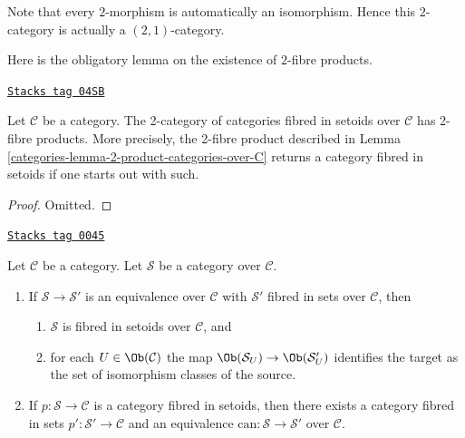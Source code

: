 Note that every $2$-morphism is automatically an isomorphism.
Hence this $2$-category is actually a $(2, 1)$-category.

Here is the obligatory lemma on the existence of $2$-fibre products.

\begin{lemma}
\label{categories-lemma-2-product-categories-fibred-setoids}
\href{https://stacks.math.columbia.edu/tag/04SB}{\texttt{Stacks tag 04SB}}

Let $\mathcal{C}$ be a category.
The 2-category of categories fibred in setoids over $\mathcal{C}$
has 2-fibre products. More precisely, the 2-fibre product described in
Lemma \ref{categories-lemma-2-product-categories-over-C} returns a category fibred in
setoids if one starts out with such.
\end{lemma}

\begin{proof}
Omitted.
\end{proof}

\begin{lemma}
\label{categories-lemma-setoid-fibres}
\href{https://stacks.math.columbia.edu/tag/0045}{\texttt{Stacks tag 0045}}

Let $\mathcal{C}$ be a category. Let $\mathcal{S}$ be a category
over $\mathcal{C}$.
\begin{enumerate}
\item If $\mathcal{S} \to \mathcal{S}'$ is an equivalence
over $\mathcal{C}$ with $\mathcal{S}'$ fibred in sets over $\mathcal{C}$,
then
\begin{enumerate}
\item $\mathcal{S}$ is fibred in setoids over $\mathcal{C}$, and
\item for each $U \in \Ob(\mathcal{C})$ the map
$\Ob(\mathcal{S}_U) \to \Ob(\mathcal{S}'_U)$
identifies the target as the set of isomorphism classes of the source.
\end{enumerate}
\item If $p : \mathcal{S} \to \mathcal{C}$ is a category fibred in setoids,
then there exists a category fibred in sets
$p' : \mathcal{S}' \to \mathcal{C}$ and an equivalence
$\text{can} : \mathcal{S} \to \mathcal{S}'$ over $\mathcal{C}$.
\end{enumerate}
\end{lemma}

